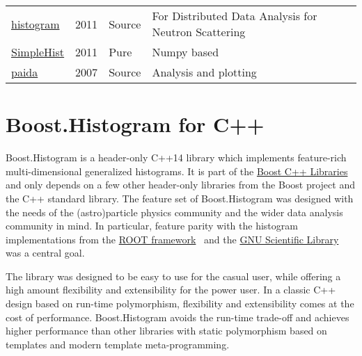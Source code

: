 \documentclass{webofc}
\begin{document}
\begin{table}
\begin{tabular}{llll}
		\href{https://pypi.org/project/histogram}{histogram}                         & 2011         & Source & For Distributed Data Analysis for Neutron Scattering \\
		\href{https://pypi.org/project/SimpleHist/}{SimpleHist}                      & 2011         & Pure   & Numpy based                                          \\
		\href{https://pypi.org/project/paida/}{paida}                                & 2007         & Source & Analysis and plotting                                \\ \hline
	\end{tabular}
\end{table}

\section{Boost.Histogram for C++}
\label{sec-bh-cpp}

%

Boost.Histogram is a header-only C++14 library which implements feature-rich multi-dimensional generalized histograms. It is part of the \href{https://www.boost.org/}{Boost C++ Libraries} and only depends on a few other header-only libraries from the Boost project and the C++ standard library. The feature set of Boost.Histogram was designed with the needs of the (astro)particle physics community and the wider data analysis community in mind. In particular, feature parity with the histogram implementations from the \href{https://root.cern.ch/}{ROOT framework}~\cite{Brun:1997pa} and the \href{https://www.gnu.org/software/gsl/}{GNU Scientific Library} was a central goal.

The library was designed to be easy to use for the casual user, while offering a high amount flexibility and extensibility for the power user. In a classic C++ design based on run-time polymorphism, flexibility and extensibility comes at the cost of performance. Boost.Histogram avoids the run-time trade-off and achieves higher performance than other libraries with static polymorphism based on templates and modern template meta-programming.
\end{document}

